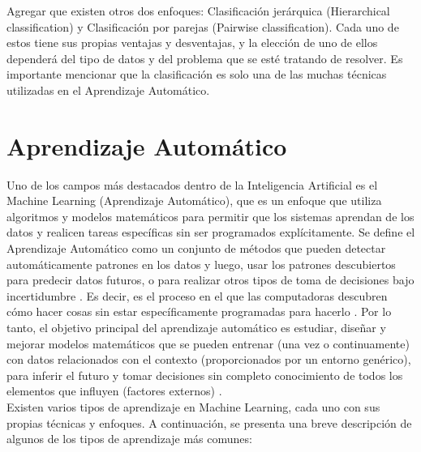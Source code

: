 Agregar que existen otros dos enfoques: Clasificación jerárquica (Hierarchical classification) y Clasificación por parejas (Pairwise classification). Cada uno de estos tiene sus propias ventajas y desventajas, y la elección de uno de ellos dependerá del tipo de datos y del problema que se esté tratando de resolver. Es importante mencionar que la clasificación es solo una de las muchas técnicas utilizadas en el Aprendizaje  Automático. 

\section{Aprendizaje Automático}
Uno de los campos más destacados dentro de la Inteligencia Artificial es el Machine Learning (Aprendizaje Automático), que es un enfoque que utiliza algoritmos y modelos matemáticos para permitir que los sistemas aprendan de los datos y realicen tareas específicas sin ser programados explícitamente.
Se define el Aprendizaje Automático como un conjunto de métodos que pueden detectar automáticamente patrones en los datos y luego, usar los patrones descubiertos para predecir datos futuros, o para realizar otros tipos de toma de decisiones bajo incertidumbre \citep{murphy2012machine}. Es decir, es el proceso en el que las computadoras descubren cómo hacer cosas sin estar específicamente programadas para hacerlo \citep{Praba2021}. Por lo tanto, el objetivo principal del aprendizaje automático es estudiar, diseñar y mejorar modelos matemáticos que se pueden entrenar (una vez o continuamente) con datos relacionados con el contexto (proporcionados por un entorno genérico), para inferir el futuro y tomar decisiones sin completo conocimiento de todos los elementos que influyen (factores externos) \citep{bonaccorso2017machine}. \\
Existen varios tipos de aprendizaje en Machine Learning, cada uno con sus propias técnicas y enfoques. A continuación, se presenta una breve descripción de algunos de los tipos de aprendizaje más comunes:
